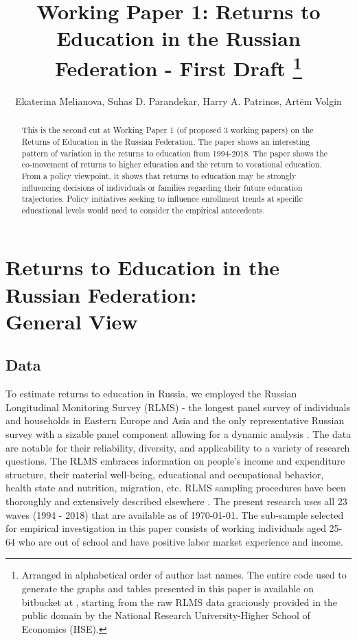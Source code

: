 \documentclass[12pt,a4paper]{article}
\numberwithin{equation}{section}
\begin{document}
\title{Working Paper 1: Returns to Education in the Russian Federation - First Draft \footnote{Arranged in alphabetical order of author last names. The entire code used to generate the graphs and tables presented in this paper is available on bitbucket at  , starting from the raw RLMS data graciously provided in the public domain by the National Research University-Higher School of Economics (HSE).}}
\author{Ekaterina Melianova, Suhas D. Parandekar, Harry A. Patrinos, Art\"{e}m Volgin}
\maketitle

\begin{abstract}
This is the second cut at Working Paper 1 (of proposed 3 working papers) on the Returns of Education in the Russian Federation. The paper shows an interesting pattern of variation in the returns to education from 1994-2018. The paper shows the co-movement of returns to higher education and the return to vocational education. From a policy viewpoint, it shows that returns to education may be strongly influencing decisions of individuals or families regarding their future education trajectories. Policy initiatives seeking to influence enrollment trends at specific educational levels would need to consider the empirical antecedents. 
\end{abstract}


\section*{Returns to Education in the Russian Federation: \\ General View}

\subsection*{Data}

To estimate returns to education in Russia, we employed the Russian Longitudinal Monitoring Survey (RLMS) - the longest panel survey of individuals and households in Eastern Europe and Asia and the only representative Russian survey with a sizable panel component allowing for a dynamic analysis \parencite{kozyreva_081._2015}. The data are notable for their reliability, diversity, and applicability to a variety of research questions. The RLMS embraces information on people's income and expenditure structure, their material well-being, educational and occupational behavior, health state and nutrition, migration, etc.  RLMS sampling procedures have been thoroughly and extensively described elsewhere \parencite{kozyreva_081._2015}. The present research uses all 23 waves (1994 - 2018) that are available as of \today. The sub-sample selected for empirical investigation in this paper consists of working individuals aged 25-64 who are out of school and have positive labor market experience and income.
\\
\end{document}
